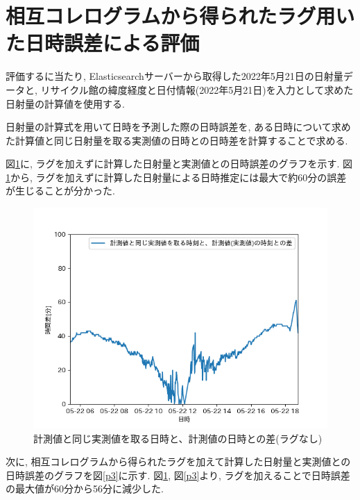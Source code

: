 \documentclass[a4j,12pt,]{jarticle}
\begin{document}
\section{相互コレログラムから得られたラグ用いた日時誤差による評価}
評価するに当たり, Elasticsearchサーバーから取得した2022年5月21日の日射量データと, リサイクル館の緯度経度と日付情報(2022年5月21日)を入力として求めた日射量の計算値を使用する.

日射量の計算式を用いて日時を予測した際の日時誤差を, ある日時について求めた計算値と同じ日射量を取る実測値の日時との日時差を計算することで求める.

図\ref{p2}に, ラグを加えずに計算した日射量と実測値との日時誤差のグラフを示す.
図\ref{p2}から, ラグを加えずに計算した日射量による日時推定には最大で約60分の誤差が生じることが分かった.

\begin{figure}[H]
  \begin{center}
    \includegraphics[width=160mm]{dt_diff.png}
    \caption{計測値と同じ実測値を取る日時と、計測値の日時との差(ラグなし)}
    \label{p2}
  \end{center}
\end{figure}

次に, 相互コレログラムから得られたラグを加えて計算した日射量と実測値との日時誤差のグラフを図\ref{p3}に示す.
図\ref{p2}, 図\ref{p3}より, ラグを加えることで日時誤差の最大値が60分から56分に減少した.
\end{document}
